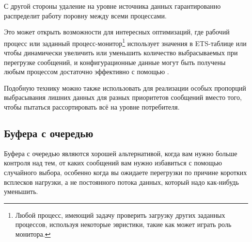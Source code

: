 \documentclass[11pt, oneside]{book}   	%
\begin{document}
С другой стороны удаление на уровне источника данных гарантированно распределит работу поровну между всеми процессами.

Это может открыть возможности для интересных оптимизаций, где рабочий процесс или заданный процесс-монитор\footnote{Любой процесс, имеющий задачу проверить загрузку других заданных процессов, используя некоторые эвристики, такие как  может играть роль монитора.} использует значения в ETS-таблице или   чтобы динамически увеличить или уменьшить количество выбрасываемых при перегрузке сообщений, и конфигурационные данные могут быть получены любым процессом достаточно эффективно с помощью .

Подобную технику можно также использовать для реализации особых пропорций выбрасывания лишних данных для разных приоритетов сообщений вместо того, чтобы пытаться рассортировать всё на уровне потребителя.


\subsection{Буфера с очередью}

Буфера с очередью являются хорошей альтернативой, когда вам нужно больше контроля над тем, от каких сообщений вам нужно избавиться с помощью случайного выбора, особенно когда вы ожидаете перегрузки по причине коротких всплесков нагрузки, а не постоянного потока данных, который надо как-нибудь уменьшить.
\end{document}
